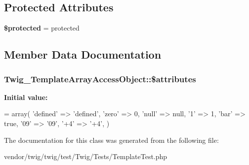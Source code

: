 \subsection*{Protected Attributes}
\begin{DoxyCompactItemize}
\item 
{\bfseries \$protected} = \textquotesingle{}protected\textquotesingle{}\hypertarget{classTwig__TemplateArrayAccessObject_ab3b6d281f6a92614c565b71e1c3581d9}{}\label{classTwig__TemplateArrayAccessObject_ab3b6d281f6a92614c565b71e1c3581d9}

\end{DoxyCompactItemize}


\subsection{Member Data Documentation}
\subsubsection[{\texorpdfstring{\$attributes}{$attributes}}]{\setlength{\rightskip}{0pt plus 5cm}Twig\+\_\+\+Template\+Array\+Access\+Object\+::\$attributes}\hypertarget{classTwig__TemplateArrayAccessObject_a4fa4d4255405a785642e00ff6f5f66d2}{}\label{classTwig__TemplateArrayAccessObject_a4fa4d4255405a785642e00ff6f5f66d2}
{\bfseries Initial value\+:}
\begin{DoxyCode}
= array(
        \textcolor{stringliteral}{'defined'} => \textcolor{stringliteral}{'defined'},
        \textcolor{stringliteral}{'zero'} => 0,
        \textcolor{stringliteral}{'null'} => null,
        \textcolor{charliteral}{'1'} => 1,
        \textcolor{stringliteral}{'bar'} => \textcolor{keyword}{true},
        \textcolor{stringliteral}{'09'} => \textcolor{stringliteral}{'09'},
        \textcolor{stringliteral}{'+4'} => \textcolor{stringliteral}{'+4'},
    )
\end{DoxyCode}


The documentation for this class was generated from the following file\+:\begin{DoxyCompactItemize}
\item 
vendor/twig/twig/test/\+Twig/\+Tests/Template\+Test.\+php\end{DoxyCompactItemize}
